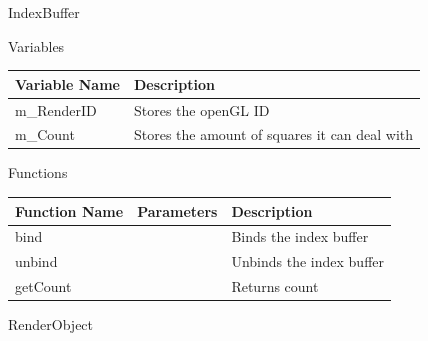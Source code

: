 \documentclass{article}
\begin{document}
                IndexBuffer
                \begin{center}
                    Variables
                    \begin{tabular}{ | m{} | m{} | }
                        \hline
                        \textbf{Variable Name} & \textbf{Description} \\
                        \hline
                        m\_RenderID & Stores the openGL ID \\
                        \hline
                        m\_Count & Stores the amount of squares it can deal with \\
                        \hline
                    \end{tabular}
                    Functions
                    \begin{tabular}{ | m{} | m{}| m{} | }
                        \hline
                        \textbf{Function Name} & \textbf{Parameters} & \textbf{Description} \\
                        \hline
                        bind & & Binds the index buffer \\
                        \hline
                        unbind & & Unbinds the index buffer \\
                        \hline
                        getCount & & Returns count \\
                        \hline
                    \end{tabular}
                \end{center}
                RenderObject
\end{document}
